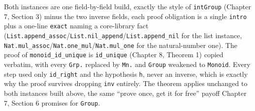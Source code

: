 Both instances are one field-by-field build, exactly the style of \texttt{intGroup} (Chapter 7, Section 3) minus the two inverse fields, each proof obligation is a single \texttt{intro} plus a one-line \texttt{exact} naming a core-library fact (\texttt{List.append\_\allowbreak{}assoc}/\texttt{List.nil\_\allowbreak{}append}/\texttt{List.append\_\allowbreak{}nil} for the list instance, \texttt{Nat.mul\_\allowbreak{}assoc}/\texttt{Nat.one\_\allowbreak{}mul}/\texttt{Nat.mul\_\allowbreak{}one} for the natural-number one). The proof of \texttt{monoid\_\allowbreak{}id\_\allowbreak{}unique} is \texttt{id\_\allowbreak{}unique} (Chapter 8, Theorem 1) copied verbatim, with every \texttt{Grp.} replaced by \texttt{Mn.} and \texttt{Group} weakened to \texttt{Monoid}. Every step used only \texttt{id\_\allowbreak{}right} and the hypothesis \texttt{h}, never an inverse, which is exactly why the proof survives dropping \texttt{inv} entirely. The theorem applies unchanged to both instances built above, the same ``prove once, get it for free'' payoff Chapter 7, Section 6 promises for \texttt{Group}.
